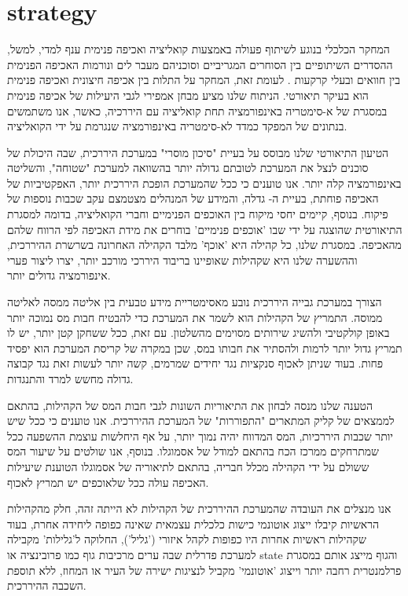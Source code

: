 \section{strategy}

המחקר הכלכלי בנוגע לשיתוף פעולה באמצעות קואליציה ואכיפה פנימית ענף למדי, למשל, ההסדרים השיתופיים בין הסוחרים המגריביים וסוכניהם מעבר לים \cite{greif_contract_1993} ונורמות האכיפה הפנימית בין חוואים ובעלי קרקעות . לעומת זאת, המחקר על התלות בין אכיפה חיצונית ואכיפה פנימית הוא בעיקר תיאורטי. הניתוח שלנו מציע מבחן אמפירי לגבי 
היעילות של אכיפה פנימית במסגרת של א-סימטריה באינפורמציה תחת קואליציה עם היררכיה, כאשר, אנו משתמשים בנתונים של המפקד כמדד לא-סימטריה באינפורמציה שנגרמת על ידי הקואליציה.

הטיעון התיאורטי שלנו מבוסס על בעיית "סיכון מוסרי"  במערכת היררכית, שבה היכולת של סוכנים לנצל את המערכת לטובתם גדולה יותר בהשוואה למערכת "שטוחה", והשליטה באינפורמציה קלה יותר. אנו טוענים כי ככל שהמערכת הופכת היררכית יותר, האפקטיביות של האכיפה פוחתת, בעיית ה- גדלה, והמידע של המנהלים מצטמצם עקב שכבות נוספות של פיקוח.  
בנוסף, קיימים יחסי מיקוח בין האוכפים הפנימיים וחברי הקואליציה,  בדומה למסגרת התיאורטית שהוצגה על ידי   שבו 'אוכפים פנימיים' בוחרים את מידת האכיפה לפי הרווח שלהם מהאכיפה. במסגרת שלנו, כל קהילה היא 'אוכף' מלבד הקהילה האחרונה בשרשרת ההיררכית, וההשערה שלנו היא שקהילות שאופיינו בריבוד היררכי מורכב יותר, יצרו ליצור פערי אינפורמציה גדולים יותר.

הצורך במערכת גבייה היררכית נובע מאסימטריית מידע טבעית בין אליטה ממסה לאליטה ממוסה. התמריץ של הקהילות הוא לשמר את המערכת כדי להבטיח חבות מס נמוכה יותר באופן קולקטיבי ולהשיג שירותים מסוימים מהשלטון. עם זאת, ככל ששחקן קטן יותר, יש לו תמריץ גדול יותר לרמות ולהסתיר את חבותו במס, שכן במקרה של קריסת המערכת הוא יפסיד פחות. בעוד שניתן לאכוף סנקציות נגד יחידים שמרמים, קשה יותר לעשות זאת נגד קבוצה גדולה מחשש למרד והתנגדות. 

הטענה שלנו מנסה לבחון את התיאוריות השונות לגבי חבות המס של הקהילות, בהתאם לממצאים של קליק המתארים "התפוררות" של המערכת ההיררכית. אנו טוענים כי ככל שיש יותר שכבות היררכיות, המס המדווח יהיה נמוך יותר, על אף היחלשות עוצמת ההשפעה ככל שמתרחקים ממרכז הכח בהתאם למודל של אסמוגלו. בנוסף, אנו שולטים על שיעור המס ששולם על ידי הקהילה מכלל חבריה, בהתאם לתיאוריה של אסמוגלו הטוענת שיעילות האכיפה עולה ככל שלאוכפים יש תמריץ לאכוף.

אנו מנצלים את העובדה שהמערכת ההיררכית של הקהילות לא הייתה זהה, חלק מהקהילות הראשיות קיבלו ייצוג אוטונמי כישות כלכלית עצמאית שאינה כפופה ליחידה אחרת, בעוד שקהילות ראשיות אחרות היו כפופות לקהל איזורי ('גליל'),  החלוקה ל'גלילות' מקבילה למערכת פדרלית שבה ערים מרכיבות גוף כמו פרובינציה או state והגוף מייצג אותם במסגרת פרלמנטרית רחבה יותר וייצוג 'אוטונמי' מקביל לנציגות ישירה של העיר או המחוז, ללא תוספת השכבה ההיררכית. 


